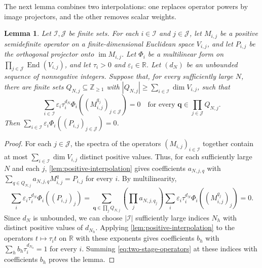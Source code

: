 \documentclass[10pt,a4paper]{article}
\theoremstyle{plain}
\newtheorem{lemma}[theorem]{Lemma}
\theoremstyle{definition}
\DeclareMathOperator{\im}{im}
\newcommand{\R}{\mathbb{R}}
\newcommand{\Z}{\mathbb{Z}}
\begin{document}
The next lemma combines two interpolations: one replaces operator powers
by image projectors, and the other removes scalar weights.
\begin{lemma}\label{lem:two-stage-interpolation}
 Let $\mathcal I,\mathcal J$ be finite sets. For each $i\in\mathcal I$ and $j\in\mathcal J$, let
 $M_{i,j}$ be a positive semidefinite operator on a finite-dimensional
 Euclidean space $V_{i,j}$, and let $P_{i,j}$ be the orthogonal projector
 onto $\im M_{i,j}$. Let $\Phi_i$ be a multilinear form on
 $\prod_{j\in\mathcal J}\operatorname{End}(V_{i,j})$, and let
 $\tau_i>0$ and $\varepsilon_i\in\R$.
 Let $(d_N)$ be an unbounded sequence of nonnegative integers.
 Suppose that, for every sufficiently large $N$, there are finite
 sets $Q_{N,j}\subseteq\Z_{\geq1}$ with
 $|Q_{N,j}|\geq\sum_{i\in\mathcal I}\dim V_{i,j}$,
 such that
 \begin{equation}\label{eq:two-stage-samples}
  \sum_{i\in\mathcal I}\varepsilon_i\tau_i^{d_N}
     \Phi_i((M_{i,j}^{q_j})_{j\in\mathcal J})=0
  \quad\text{for every }\mathbf q\in\prod_{j\in\mathcal J}Q_{N,j}.
 \end{equation}
 Then $\sum_{i\in\mathcal I}\varepsilon_i\Phi_i((P_{i,j})_{j\in\mathcal J})=0$.
\end{lemma}
\begin{proof}
 For each $j\in\mathcal J$, the spectra of the operators $(M_{i,j})_{i\in\mathcal I}$
 together contain at most $\sum_{i\in\mathcal I}\dim V_{i,j}$ distinct positive
 values. Thus, for each sufficiently large $N$ and each $j$,
 \cref{lem:positive-interpolation} gives coefficients $a_{N,j,q}$ with
 $\sum_{q\in Q_{N,j}}a_{N,j,q}M_{i,j}^q=P_{i,j}$ for every $i$.
 By multilinearity,
 \begin{equation}\label{eq:two-stage-operators}
  \sum_i\varepsilon_i\tau_i^{d_N}\Phi_i((P_{i,j})_j)
  =\sum_{\mathbf q\in\prod_jQ_{N,j}}
      \left(\prod_ja_{N,j,q_j}\right)
      \sum_i\varepsilon_i\tau_i^{d_N}\Phi_i((M_{i,j}^{q_j})_j)=0.
 \end{equation}
 Since $d_N$ is unbounded, we can choose $|\mathcal I|$ sufficiently large indices $N_h$
 with distinct positive values of $d_{N_h}$.
 Applying \cref{lem:positive-interpolation} to the operators
 $t\mapsto\tau_i t$ on $\R$ with these exponents gives coefficients $b_h$
 with $\sum_hb_h\tau_i^{d_{N_h}}=1$ for every $i$.
 Summing \cref{eq:two-stage-operators} at these indices with
 coefficients $b_h$ proves the lemma.
\end{proof}
\end{document}
